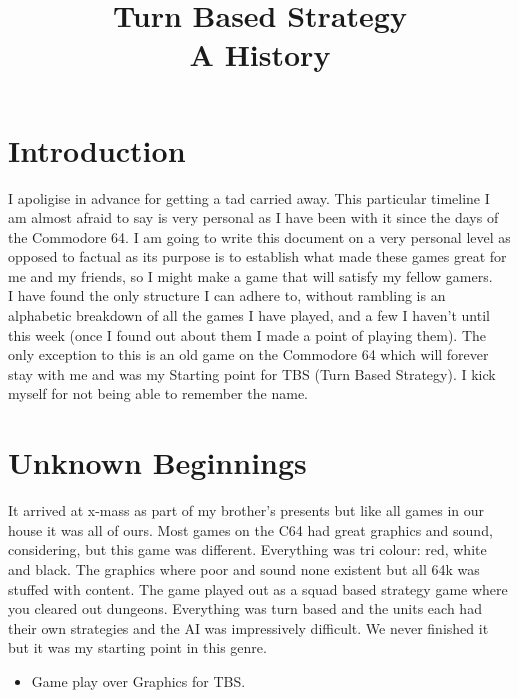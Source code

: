 \documentclass[a4paper]{article}
\title{\textbf{Turn Based Strategy} \\ A History}
\begin{document}
\maketitle
\tableofcontents

\newpage
\section{Introduction}
I apoligise in advance for getting a tad carried away. This particular timeline I am almost afraid to say is very personal as I have been with it since the days of the Commodore 64. I am going to write this document on a very personal level as opposed to factual as its purpose is to establish what made these games great for me and my friends, so I might make a game that will satisfy my fellow gamers. \\
I have found the only structure I can adhere to, without rambling is an alphabetic breakdown of all the games I have played, and a few I haven't until this week (once I found out about them I made a point of playing them). The only exception to this is an old game on the Commodore 64 which will forever stay with me and was my Starting point for TBS (Turn Based Strategy). I kick myself for not being able to remember the name.

\section{Unknown Beginnings}
It arrived at x-mass as part of my brother's presents but like all games in our house it was all of ours. Most games on the C64 had great graphics and sound, considering, but this game was different. Everything was tri colour: red, white and black. The graphics where poor and sound none existent but all 64k was stuffed with content. The game played out as a squad based strategy game where you cleared out dungeons.
Everything was turn based and the units each had their own strategies and the AI was impressively difficult. We never finished it but it was my starting point in this genre.
\begin{itemize}
\item Game play over Graphics for TBS.
\end{itemize}
\end{document}
